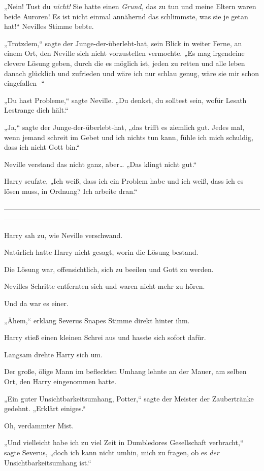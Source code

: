 {„Nein! Tust du \emph{nicht!} Sie hatte einen \emph{Grund,} das zu tun und meine Eltern waren beide Auroren! Es ist nicht einmal annähernd das schlimmste, was sie je getan hat!“ Nevilles Stimme bebte.

„Trotzdem,“ sagte der Junge-der-überlebt-hat, sein Blick in weiter Ferne, an einem Ort, den Neville sich nicht vorzustellen vermochte. „Es mag irgendeine clevere Lösung geben, durch die es möglich ist, jeden zu retten und alle leben danach glücklich und zufrieden und wäre ich nur schlau genug, wäre sie mir schon eingefallen -“

„Du hast Probleme,“ sagte Neville. „Du denkst, du solltest sein, wofür Lesath Lestrange dich hält.“

„Ja,“ sagte der Junge-der-überlebt-hat, „das trifft es ziemlich gut. Jedes mal, wenn jemand schreit im Gebet und ich nichts tun kann, fühle ich mich schuldig, dass ich nicht Gott bin.“

Neville verstand das nicht ganz, aber… „Das klingt nicht gut.“

Harry seufzte, „Ich weiß, dass ich ein Problem habe und ich weiß, dass ich es lösen muss, in Ordnung? Ich arbeite dran.“

--------------------------------------------------------------------------------------------------------------------------------------------

Harry sah zu, wie Neville verschwand.

Natürlich hatte Harry nicht gesagt, worin die Lösung bestand.

Die Lösung war, offensichtlich, sich zu beeilen und Gott zu werden.

Nevilles Schritte entfernten sich und waren nicht mehr zu hören.

Und da war es einer.

„Ähem,“ erklang Severus Snapes Stimme direkt hinter ihm.

Harry stieß einen kleinen Schrei aus und hasste sich sofort dafür.

Langsam drehte Harry sich um.

Der große, ölige Mann im befleckten Umhang lehnte an der Mauer, am selben Ort, den Harry eingenommen hatte.

„Ein guter Unsichtbarkeitsumhang, Potter,“ sagte der Meister der Zaubertränke gedehnt. „Erklärt einiges.“

Oh, verdammter Mist.

„Und vielleicht habe ich zu viel Zeit in Dumbledores Gesellschaft verbracht,“ sagte Severus, „doch ich kann nicht umhin, mich zu fragen, ob es \emph{der} Unsichtbarkeitsumhang ist.“

}
